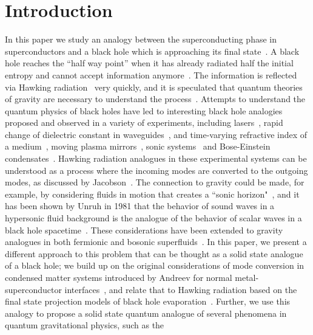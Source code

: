 \documentclass[10pt,letterpaper,aps,onecolumn,superscriptaddress,floatfix,notitlepage]{revtex4-1}
\begin{document}
	\maketitle
	\section{Introduction}
	\label{S:1}
	In this paper we study an analogy between the superconducting phase in superconductors and a black hole which is approaching its final state~\cite{horowitz,preskill}. A black hole reaches the ``half way point'' when it has already radiated half the initial entropy and cannot accept information anymore~\cite{preskill}. The information is reflected via Hawking radiation~\cite{Hawking1975} very quickly, and it is speculated that quantum theories of gravity are necessary to understand the process~\cite{preskill,horowitz,projection,infopara}. Attempts to understand the quantum physics of black holes have led to interesting black hole analogies proposed and observed in a variety of experiments, including lasers~\cite{bec,laser}, rapid change of dielectric constant in waveguides~\cite{waveguide}, and time-varying refractive index of a medium~\cite{Refraction}, moving plasma mirrors~\cite{plasma}, sonic systems~\cite{sound1,sound2} and  Bose-Einstein condensates~\cite{zapata2011resonant}. Hawking radiation analogues in these experimental systems can be understood as a process where the incoming modes are converted to the outgoing modes, as discussed by Jacobson~\cite{bhmodes}. The connection to gravity could be made, for example, by considering fluids in motion that creates a ``sonic horizon"~\cite{zapata2011resonant}, and it has been shown by Unruh in 1981 that the behavior of sound waves in a hypersonic fluid background is the analogue of the behavior of scalar waves in a black hole spacetime~\cite{sound1,sound2}. These considerations have been extended to gravity analogues in both fermionic and bosonic superfluids~\cite{fischer2001thermal}. In this paper, we present a different approach to this problem that can be thought as a solid state analogue of a black hole; we build up on the original considerations of mode conversion in condensed matter systems introduced by Andreev for normal metal-superconductor interfaces~\cite{andreev,Pannet,spintron,artemenko1978excess,artemenko1979theory,artemenko1979excess,zaitsev1980theory}, and relate that to Hawking radiation based on the final state projection models of black hole evaporation~\cite{horowitz,projection}. Further, we use this analogy to propose a solid state quantum analogue of several phenomena in quantum gravitational physics, such as the 
\end{document}
